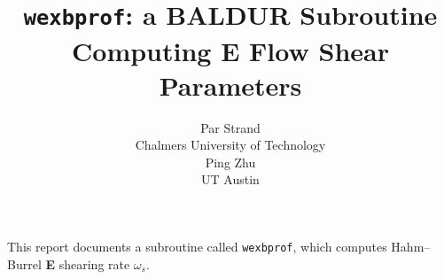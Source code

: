 %
%
\headheight 0pt \headsep 0pt  \topmargin 0pt  \oddsidemargin 0pt
\textheight 9.0in \textwidth 6.5in

\title{ {\tt wexbprof}: a BALDUR Subroutine \\
 Computing {\bf E} Flow Shear Parameters}     %
\author{
        Par Strand \\ Chalmers University of Technology \\
	Ping Zhu \\ UT Austin }
\maketitle                 %

This report documents a subroutine called {\tt wexbprof}, which computes Hahm--Burrel {\bf E} shearing rate $\omega_s$.

